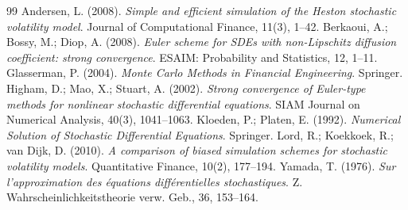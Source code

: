 \documentclass[11pt]{article}
\theoremstyle{plain}
\theoremstyle{definition}
\theoremstyle{remark}
\begin{document}
\begin{thebibliography}{99}
                Andersen, L. (2008). \emph{Simple and efficient simulation of the Heston stochastic volatility model}. Journal of Computational Finance, 11(3), 1--42.
       Berkaoui, A.; Bossy, M.; Diop, A. (2008). \emph{Euler scheme for SDEs with non-Lipschitz diffusion coefficient: strong convergence}. ESAIM: Probability and Statistics, 12, 1--11.
              Glasserman, P. (2004). \emph{Monte Carlo Methods in Financial Engineering}. Springer.
         Higham, D.; Mao, X.; Stuart, A. (2002). \emph{Strong convergence of Euler-type methods for nonlinear stochastic differential equations}. SIAM Journal on Numerical Analysis, 40(3), 1041--1063.
           Kloeden, P.; Platen, E. (1992). \emph{Numerical Solution of Stochastic Differential Equations}. Springer.
                    Lord, R.; Koekkoek, R.; van Dijk, D. (2010). \emph{A comparison of biased simulation schemes for stochastic volatility models}. Quantitative Finance, 10(2), 177--194.
                  Yamada, T. (1976). \emph{Sur l'approximation des \'equations diff\'erentielles stochastiques}. Z. Wahrscheinlichkeitstheorie verw. Geb., 36, 153--164.
\end{thebibliography}
\end{document}
